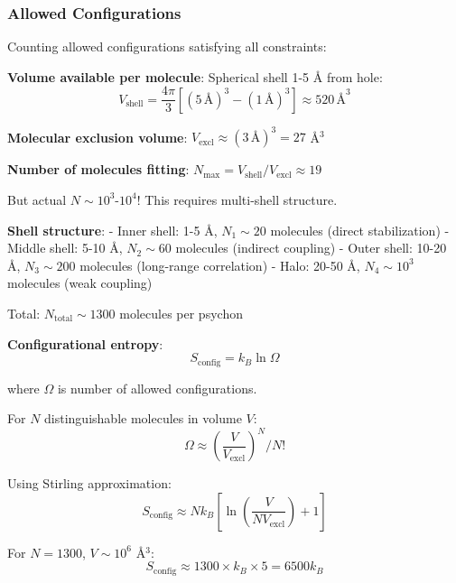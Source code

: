 \documentclass[11pt,onecolumn]{article}
\begin{document}
\begin{figure}[!htbp]
\label{fig:consciousness_geometry}
\end{figure}


\subsubsection{Allowed Configurations}

Counting allowed configurations satisfying all constraints:

\textbf{Volume available per molecule}: Spherical shell 1-5 Å from hole:
\begin{equation}
V_{\text{shell}} = \frac{4\pi}{3}[(5\,\text{Å})^3 - (1\,\text{Å})^3] \approx 520\,\text{Å}^3
\end{equation}

\textbf{Molecular exclusion volume}: $V_{\text{excl}} \approx (3\,\text{Å})^3 = 27$ Å$^3$

\textbf{Number of molecules fitting}: $N_{\max} = V_{\text{shell}} / V_{\text{excl}} \approx 19$

But actual $N \sim 10^3$-$10^4$! This requires multi-shell structure.

\textbf{Shell structure}:
- Inner shell: 1-5 Å, $N_1 \sim 20$ molecules (direct stabilization)
- Middle shell: 5-10 Å, $N_2 \sim 60$ molecules (indirect coupling)
- Outer shell: 10-20 Å, $N_3 \sim 200$ molecules (long-range correlation)
- Halo: 20-50 Å, $N_4 \sim 10^3$ molecules (weak coupling)

Total: $N_{\text{total}} \sim 1300$ molecules per psychon

\textbf{Configurational entropy}:
\begin{equation}
S_{\text{config}} = k_B \ln\Omega
\end{equation}

where $\Omega$ is number of allowed configurations.

For $N$ distinguishable molecules in volume $V$:
\begin{equation}
\Omega \approx \left(\frac{V}{V_{\text{excl}}}\right)^N / N!
\end{equation}

Using Stirling approximation:
\begin{equation}
S_{\text{config}} \approx N k_B \left[\ln\left(\frac{V}{N V_{\text{excl}}}\right) + 1\right]
\end{equation}

For $N = 1300$, $V \sim 10^6$ Å$^3$:
\begin{equation}
S_{\text{config}} \approx 1300 \times k_B \times 5 = 6500 k_B
\end{equation}
\end{document}
